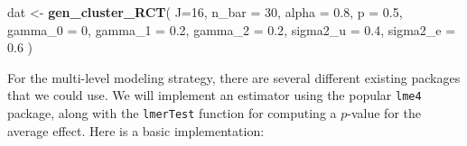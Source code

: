 \documentclass[
]{book}
\newenvironment{Shaded}{\begin{snugshade}}{\end{snugshade}}
\newcommand{\AttributeTok}[1]{\textcolor[rgb]{0.13,0.29,0.53}{#1}}
\newcommand{\ControlFlowTok}[1]{\textcolor[rgb]{0.13,0.29,0.53}{\textbf{#1}}}
\newcommand{\DecValTok}[1]{\textcolor[rgb]{0.00,0.00,0.81}{#1}}
\newcommand{\FloatTok}[1]{\textcolor[rgb]{0.00,0.00,0.81}{#1}}
\newcommand{\FunctionTok}[1]{\textcolor[rgb]{0.13,0.29,0.53}{\textbf{#1}}}
\newcommand{\NormalTok}[1]{#1}
\newcommand{\OtherTok}[1]{\textcolor[rgb]{0.56,0.35,0.01}{#1}}
\newcommand{\SpecialCharTok}[1]{\textcolor[rgb]{0.81,0.36,0.00}{\textbf{#1}}}
\newcommand{\StringTok}[1]{\textcolor[rgb]{0.31,0.60,0.02}{#1}}
\begin{document}
\begin{Shaded}
\begin{Highlighting}[]
\NormalTok{dat }\OtherTok{\textless{}{-}} \FunctionTok{gen\_cluster\_RCT}\NormalTok{( }
  \AttributeTok{J=}\DecValTok{16}\NormalTok{, }\AttributeTok{n\_bar =} \DecValTok{30}\NormalTok{, }\AttributeTok{alpha =} \FloatTok{0.8}\NormalTok{, }\AttributeTok{p =} \FloatTok{0.5}\NormalTok{, }
  \AttributeTok{gamma\_0 =} \DecValTok{0}\NormalTok{, }\AttributeTok{gamma\_1 =} \FloatTok{0.2}\NormalTok{, }\AttributeTok{gamma\_2 =} \FloatTok{0.2}\NormalTok{,}
  \AttributeTok{sigma2\_u =} \FloatTok{0.4}\NormalTok{, }\AttributeTok{sigma2\_e =} \FloatTok{0.6}
\NormalTok{)}
\end{Highlighting}
\end{Shaded}

For the multi-level modeling strategy, there are several different existing packages that we could use.
We will implement an estimator using the popular \texttt{lme4} package, along with the \texttt{lmerTest} function for computing a \(p\)-value for the average effect.
Here is a basic implementation:

\begin{Shaded}
\end{Shaded}
\end{document}
